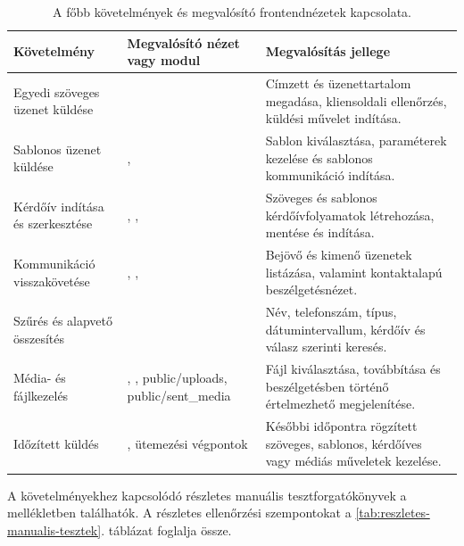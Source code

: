 \begin{table}[H]
\centering
\caption{A főbb követelmények és megvalósító frontendnézetek kapcsolata.}
\label{tab:kovetelmenyek-megvalositas}
\small
\setlength{\tabcolsep}{4pt}
\renewcommand{\arraystretch}{1.25}

\begin{tabularx}{\textwidth}{|>{\raggedright\arraybackslash}p{}|>{\raggedright\arraybackslash}p{}|Y|}
\hline
\textbf{Követelmény} &
\textbf{Megvalósító nézet vagy modul} &
\textbf{Megvalósítás jellege} \\
\hline

Egyedi szöveges üzenet küldése &
 &
Címzett és üzenettartalom megadása, kliensoldali ellenőrzés, küldési művelet indítása. \\
\hline

Sablonos üzenet küldése &
,  &
Sablon kiválasztása, paraméterek kezelése és sablonos kommunikáció indítása. \\
\hline

Kérdőív indítása és szerkesztése &
, ,  &
Szöveges és sablonos kérdőívfolyamatok létrehozása, mentése és indítása. \\
\hline

Kommunikáció visszakövetése &
, ,  &
Bejövő és kimenő üzenetek listázása, valamint kontaktalapú beszélgetésnézet. \\
\hline

Szűrés és alapvető összesítés &
 &
Név, telefonszám, típus, dátumintervallum, kérdőív és válasz szerinti keresés. \\
\hline

Média- és fájlkezelés &
, , public/uploads, public/sent\_media &
Fájl kiválasztása, továbbítása és beszélgetésben történő értelmezhető megjelenítése. \\
\hline

Időzített küldés &
, ütemezési végpontok &
Későbbi időpontra rögzített szöveges, sablonos, kérdőíves vagy médiás műveletek kezelése. \\
\hline

\end{tabularx}
\end{table}
A követelményekhez kapcsolódó részletes manuális tesztforgatókönyvek a mellékletben találhatók. A részletes ellenőrzési szempontokat a \ref{tab:reszletes-manualis-tesztek}. táblázat foglalja össze.

